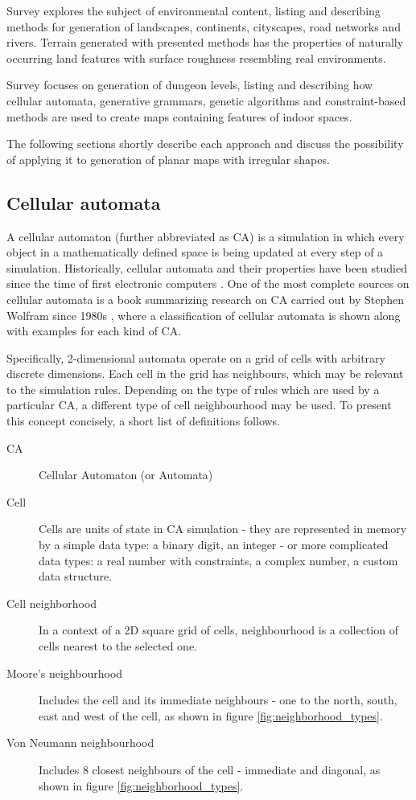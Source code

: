 \documentclass[12pt]{report}
\begin{document}
Survey \autocite{de2011survey} explores the subject of environmental content, listing and describing methods for generation of landscapes, continents, cityscapes, road networks and rivers. Terrain generated with presented methods has the properties of naturally occurring land features with surface roughness resembling real environments.

Survey \autocite{van2014procedural} focuses on generation of dungeon levels, listing and describing how cellular automata, generative grammars, genetic algorithms and constraint-based methods are used to create maps containing features of indoor spaces.

The following sections shortly describe each approach and discuss the possibility of applying it to generation of planar maps with irregular shapes.

\subsection{Cellular automata}
A cellular automaton (further abbreviated as CA) is a simulation in which every object in a mathematically defined space is being updated at every step of a simulation. Historically, cellular automata and their properties have been studied since the time of first electronic computers \autocite{Sarkar:2000:BHC:349194.349202}. One of the most complete sources on cellular automata is a book summarizing research on CA carried out by Stephen Wolfram since 1980s \autocite{wolfram2002new}, where a classification of cellular automata is shown along with examples for each kind of CA. 

Specifically, 2-dimensional automata operate on a grid of cells with arbitrary discrete dimensions. Each cell in the grid has neighbours, which may be relevant to the simulation rules. Depending on the type of rules which are used by a particular CA, a different type of cell neighbourhood may be used. To present this concept concisely, a short list of definitions follows.

\begin{description}
	\item[CA] Cellular Automaton (or Automata)
	\item[Cell] Cells are units of state in CA simulation - they are represented in memory by a simple data type: a binary digit, an integer - or more complicated data types: a real number with constraints, a complex number, a custom data structure.  
	\item[Cell neighborhood] In a context of a 2D square grid of cells, neighbourhood is a collection of cells nearest to the selected one.
	\item[Moore's neighbourhood] Includes the cell and its immediate neighbours - one to the north, south, east and west of the cell, as shown in figure \ref{fig:neighborhood_types}.
	\item[Von Neumann neighbourhood] Includes 8 closest neighbours of the cell - immediate and diagonal, as shown in figure \ref{fig:neighborhood_types}.
\end{description}
 
\end{document}
